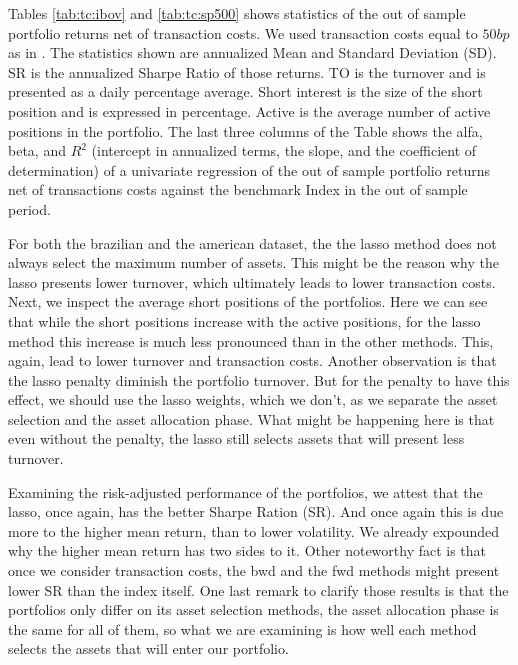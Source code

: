 \documentclass[preprint, doubleblind, authoryear,10pt]{elsarticle}
\begin{document}

Tables \ref{tab:tc:ibov} and \ref{tab:tc:sp500} shows statistics of the out of sample portfolio returns net of transaction costs.
We used transaction costs equal to $50bp$ as in \cite{dgu2009}.
The statistics shown are annualized Mean and Standard Deviation (SD).
SR is the annualized Sharpe Ratio of those returns.
TO is the turnover and is presented as a daily percentage average.
Short interest is the size of the short position and is expressed in percentage.
Active is the average number of active positions in the portfolio.
The last three columns of the Table shows the alfa, beta, and $R^2$ (intercept in annualized terms, the slope, and the coefficient of determination) of a univariate regression of the out of sample portfolio returns net of transactions costs against the benchmark Index in the out of sample period.

For both the brazilian and the american dataset, the the lasso method does not always select the maximum number of assets.
This might be the reason why the lasso presents lower turnover, which ultimately leads to lower transaction costs.
Next, we inspect the average short positions of the portfolios.
Here we can see that while the short positions increase with the active positions, for the lasso method this increase is much less pronounced than in the other methods.
This, again, lead to lower turnover and transaction costs.
Another observation is that the lasso penalty diminish the portfolio turnover.
But for the penalty to have this effect, we should use the lasso weights, which we don't, as we separate the asset selection and the asset allocation phase.
What might be happening here is that even without the penalty, the lasso still selects assets that will present less turnover.

Examining the risk-adjusted performance of the portfolios, we attest that the lasso, once again, has the better Sharpe Ration (SR).
And once again this is due more to the higher mean return, than to lower volatility.
We already expounded why the higher mean return has two sides to it.
Other noteworthy fact is that once we consider transaction costs, the bwd and the fwd methods might present lower SR than the index itself.
One last remark to clarify those results is that the portfolios only differ on its asset selection methods, the asset allocation phase is the same for all of them, so what we are examining is how well each method selects the assets that will enter our portfolio.
\end{document}
